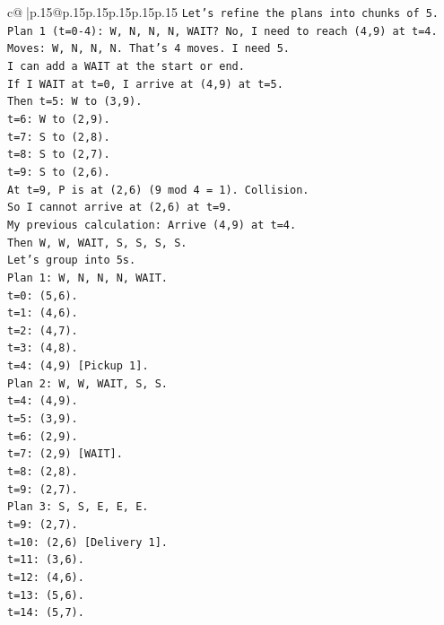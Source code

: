 \documentclass{article}
\begin{document}
{\begin{supertabular}{c@{$\;$}|p{.15\linewidth}@{}p{.15\linewidth}p{.15\linewidth}p{.15\linewidth}p{.15\linewidth}p{.15\linewidth}}
{{{\texttt{Let's refine the plans into chunks of 5.} \\
\texttt{Plan 1 (t=0{-}4): W, N, N, N, WAIT? No, I need to reach (4,9) at t=4.} \\
\texttt{Moves: W, N, N, N. That's 4 moves. I need 5.} \\
\texttt{I can add a WAIT at the start or end.} \\
\texttt{If I WAIT at t=0, I arrive at (4,9) at t=5.} \\
\texttt{Then t=5: W to (3,9).} \\
\texttt{t=6: W to (2,9).} \\
\texttt{t=7: S to (2,8).} \\
\texttt{t=8: S to (2,7).} \\
\texttt{t=9: S to (2,6).} \\
\texttt{At t=9, P is at (2,6) (9 mod 4 = 1). Collision.} \\
\texttt{So I cannot arrive at (2,6) at t=9.} \\
\texttt{My previous calculation: Arrive (4,9) at t=4.} \\
\texttt{Then W, W, WAIT, S, S, S, S.} \\
\texttt{Let's group into 5s.} \\
\texttt{Plan 1: W, N, N, N, WAIT.} \\
\texttt{t=0: (5,6).} \\
\texttt{t=1: (4,6).} \\
\texttt{t=2: (4,7).} \\
\texttt{t=3: (4,8).} \\
\texttt{t=4: (4,9) {[}Pickup 1{]}.} \\
\texttt{Plan 2: W, W, WAIT, S, S.} \\
\texttt{t=4: (4,9).} \\
\texttt{t=5: (3,9).} \\
\texttt{t=6: (2,9).} \\
\texttt{t=7: (2,9) {[}WAIT{]}.} \\
\texttt{t=8: (2,8).} \\
\texttt{t=9: (2,7).} \\
\texttt{Plan 3: S, S, E, E, E.} \\
\texttt{t=9: (2,7).} \\
\texttt{t=10: (2,6) {[}Delivery 1{]}.} \\
\texttt{t=11: (3,6).} \\
\texttt{t=12: (4,6).} \\
\texttt{t=13: (5,6).} \\
\texttt{t=14: (5,7).} \\
}}}
\end{supertabular}}
\end{document}
